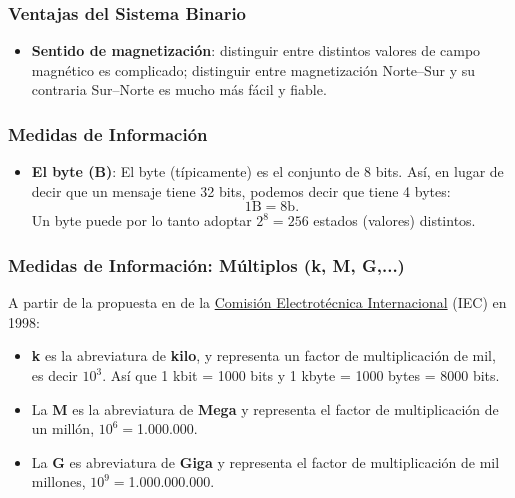 \documentclass{beamer}
\begin{document}
\begin{frame}[fragile]\frametitle{Ventajas del Sistema Binario}
\begin{itemize}
	\item \textbf{Sentido de magnetización}: distinguir entre distintos valores de campo magnético es complicado; distinguir entre magnetización Norte--Sur y su contraria Sur--Norte es mucho más fácil y fiable.
\end{itemize}
\end{frame}
\begin{frame}[fragile]\frametitle{Medidas de Información}
\begin{itemize}
\item \textbf{El byte (B)}: El byte (típicamente) es el conjunto de 8 bits. Así, en lugar de decir que un mensaje tiene 32 bits, podemos decir que tiene 4 bytes:
$$
1 \text{B} = 8 \text{b}.
$$
Un byte puede por lo tanto adoptar $2^8=256$ estados (valores) distintos. 
\end{itemize}
\end{frame}


\begin{frame}[fragile]\frametitle{Medidas de Información: Múltiplos (k, M, G,...)}
A partir de la propuesta en de la \href{https://es.wikipedia.org/wiki/Comisi%C3%B3n_Electrot%C3%A9cnica_Internacional}{Comisi\'on Electrot\'ecnica Internacional} (IEC) en 1998:
\begin{itemize}
	\item \textbf{k} es la abreviatura de \textbf{kilo}, y representa un factor de multiplicación de mil, es decir $10^3$. Así que 1 kbit = 1000 bits y 1 kbyte = 1000 bytes = 8000 bits. 
	
	\item La \textbf{M} es la abreviatura de \textbf{Mega} y representa el factor de multiplicación de un mill\'on, $10^{6}= $1.000.000.
	
	\item La \textbf{G} es abreviatura de \textbf{Giga} y representa el factor de multiplicación de mil millones, $10^{9} = $1.000.000.000.
\end{itemize}
\end{frame}
\end{document}
